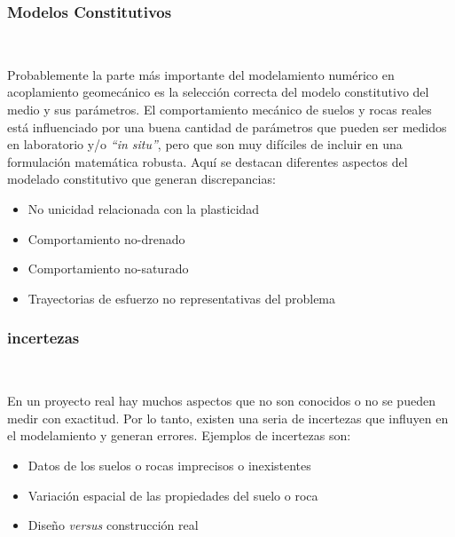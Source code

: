 \subsubsection{Modelos Constitutivos}~\hypertarget{sec:sec2343}{}
\label{sec:sec2343}

Probablemente la parte más importante del modelamiento numérico en acoplamiento geomecánico es la selección correcta del modelo constitutivo del medio y sus parámetros. El comportamiento mecánico de suelos y rocas reales está influenciado por una buena cantidad de parámetros que pueden ser medidos en laboratorio y/o \textit{“in situ”}, pero que son muy difíciles de incluir en una formulación matemática robusta. Aquí se destacan diferentes aspectos del modelado constitutivo que generan discrepancias:

\begin{itemize}
    \item No unicidad relacionada con la plasticidad
    \item Comportamiento no-drenado
    \item Comportamiento no-saturado
    \item Trayectorias de esfuerzo no representativas del problema
\end{itemize}

\subsubsection{incertezas}~\hypertarget{sec:sec2344}{}
\label{sec:sec2344}

En un proyecto real hay muchos aspectos que no son conocidos o no se pueden medir con exactitud. Por lo tanto, existen una seria de incertezas que influyen en el modelamiento y generan errores. Ejemplos de incertezas son:

\begin{itemize}
    \item Datos de los suelos o rocas imprecisos o inexistentes
    \item Variación espacial de las propiedades del suelo o roca
    \item Diseño \textit{versus} construcción real
\end{itemize}




